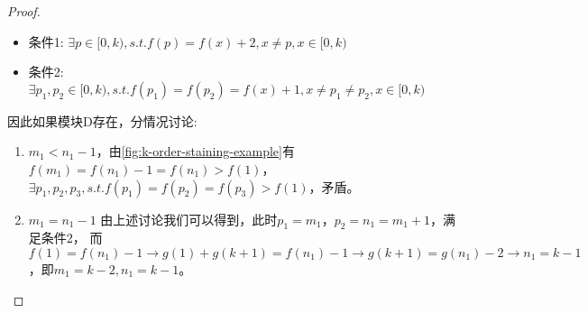 \begin{proof}
    \begin{itemize}
        \item 条件1: $\exists p \in [0, k), s.t. f(p) = f(x) + 2, x \neq p , x \in [0, k)$
        \item 条件2: $\exists p_1, p_2 \in [0, k), s.t. f(p_1) = f(p_2) = f(x) + 1, x \neq p_1 \neq p_2, x \in [0, k)$
    \end{itemize}

    因此如果模块D存在，分情况讨论:

    \begin{enumerate}
        \item $m_1 < n_1 - 1$，由\ref{fig:k-order-staining-example}有$f(m_1) = f(n_1) - 1 = f(n_1) > f(1)$，$\exists p_1, p_2, p_3, s.t. f(p_1) = f(p_2) = f(p_3) > f(1)$，矛盾。
        \item $m_1 = n_1 - 1$ 由上述讨论我们可以得到，此时$p_1 = m_1$，$p_2 = n_1 = m_1 + 1$，满足条件2，
              而$f(1) = f(n_1) - 1 \rightarrow g(1) + g(k + 1) = f(n_1) - 1 \rightarrow g(k + 1) = g(n_1) - 2 \rightarrow n_1 = k - 1$，即$m_1 = k - 2, n_1 = k - 1$。


\end{enumerate}
\end{proof}
